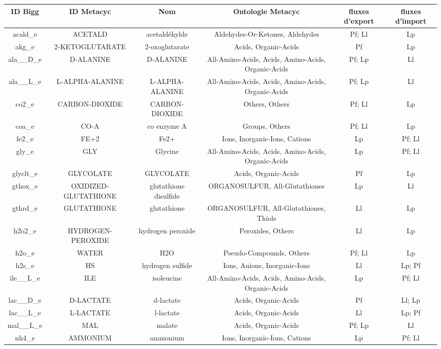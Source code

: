 \begin{table}[H]
\centering
\begin{adjustbox}{width=\textwidth}
\begin{tabular}{|c|c|c|c|c|c|}
\hline
ID Bigg & ID Metacyc & Nom & Ontologie Metacyc&fluxes d'export & fluxes d'import\\
\hline
acald\_e	& ACETALD &	acetaldéhylde & Aldehydes-Or-Ketones, Aldehydes	& Pf; Ll &	Lp \\
akg\_e &	2-KETOGLUTARATE	& 2-oxoglutarate &	Acids, Organic-Acids	& Pf &	Lp \\
ala\_\_D\_e &	D-ALANINE &	D-ALANINE &	All-Amino-Acids, Acids, Amino-Acids, Organic-Acids	& Pf; Lp &	Ll \\
ala\_\_L\_e	& L-ALPHA-ALANINE &	L-ALPHA-ALANINE &	All-Amino-Acids, Acids, Amino-Acids, Organic-Acids	& Pf; Lp	& Ll \\
co2\_e &	CARBON-DIOXIDE	& CARBON-DIOXIDE	& Others, Others	& Pf; Ll &	Lp \\
coa\_e &	CO-A &	co enzyme A &	Groups, Others	& Pf; Ll	& Lp \\
fe2\_e	& FE+2	& Fe2+&	Ions, Inorganic-Ions, Cations &	Lp	& Pf; Ll \\
gly\_e	& GLY	& Glycine	& All-Amino-Acids, Acids, Amino-Acids, Organic-Acids &	Lp &	Pf; Ll \\
glyclt\_e &	GLYCOLATE &	GLYCOLATE	& Acids, Organic-Acids	& Pf &	Lp \\
gthox\_e &	OXIDIZED-GLUTATHIONE &	glutathione disulfide	& ORGANOSULFUR, All-Glutathiones &	Lp &	Ll \\
gthrd\_e	& GLUTATHIONE &	glutathione	& ORGANOSULFUR, All-Glutathiones, Thiols	& Ll	& Lp \\
h2o2\_e &	HYDROGEN-PEROXIDE &	hydrogen peroxide &	Peroxides, Others	& Ll &	Lp \\
h2o\_e	& WATER	& H2O	& Pseudo-Compounds, Others &	Pf; Ll	& Lp \\
h2s\_e	& HS	& hydrogen sulfide &	Ions, Anions, Inorganic-Ions	& Ll	& Lp; Pf \\
ile\_\_L\_e &	ILE &	isoleucine &	All-Amino-Acids, Acids, Amino-Acids, Organic-Acids &	Lp	& Pf; Ll \\
lac\_\_D\_e &	D-LACTATE &	d-lactate &	Acids, Organic-Acids	& Pf &	Ll; Lp \\
lac\_\_L\_e &	L-LACTATE &	l-lactate &	Acids, Organic-Acids &	Ll	& Lp; Pf \\
mal\_\_L\_e &	MAL	& malate &	Acids, Organic-Acids	& Pf; Lp &	Ll \\
nh4\_e &	AMMONIUM &	ammonium &	Ions, Inorganic-Ions, Cations	& Lp	& Pf; Ll \\

\end{tabular}
\end{adjustbox}
\end{table}
